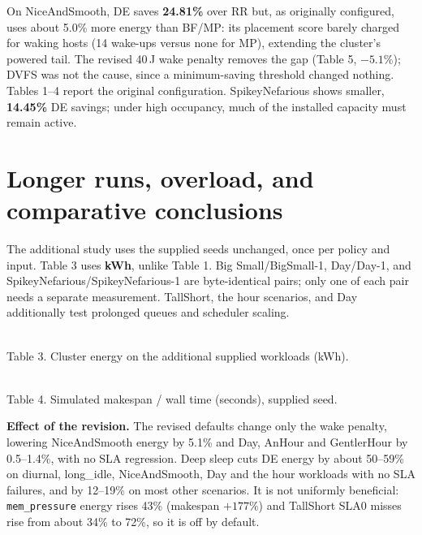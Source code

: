 \documentclass[10pt,letterpaper]{article}
\begin{document}
On NiceAndSmooth, DE saves \textbf{24.81\%} over RR but, as originally configured, uses about 5.0\% more energy
than BF/MP: its placement score barely charged for waking hosts (14 wake-ups versus none for MP), extending the
cluster's powered tail. The revised 40\,J wake penalty removes the gap (Table 5, $-5.1\%$); DVFS was not the cause, since
a minimum-saving threshold changed nothing. Tables 1--4 report the original configuration. SpikeyNefarious shows smaller, \textbf{14.45\%} DE savings;
under high occupancy, much of the installed capacity must remain active.

\small
\section*{Longer runs, overload, and comparative conclusions}
The additional study uses the supplied seeds unchanged, once per policy and input.
Table 3 uses \textbf{kWh}, unlike Table 1. Big Small/BigSmall-1, Day/Day-1, and
SpikeyNefarious/SpikeyNefarious-1 are byte-identical pairs; only one of each pair
needs a separate measurement. TallShort, the hour scenarios, and Day additionally
test prolonged queues and scheduler scaling.

\begin{center}
\small

\\[3pt]Table 3. Cluster energy on the additional supplied workloads (kWh).
\end{center}
\begin{center}
\small

\\[3pt]Table 4. Simulated makespan / wall time (seconds), supplied seed.
\end{center}

\begin{center}

\end{center}
\textbf{Effect of the revision.} The revised defaults change only the wake penalty, lowering NiceAndSmooth energy by 5.1\% and Day, AnHour and GentlerHour by 0.5--1.4\%, with no SLA regression. Deep sleep cuts DE energy by about 50--59\% on diurnal, long\_idle, NiceAndSmooth, Day and the hour workloads with no SLA failures, and by 12--19\% on most other scenarios. It is not uniformly beneficial: \texttt{mem\_pressure} energy rises 43\% (makespan $+177\%$) and TallShort SLA0 misses rise from about 34\% to 72\%, so it is off by default.
\end{document}

